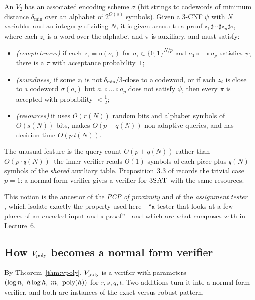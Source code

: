 \begin{definition}\label{def:normal}
An  $V_2$ has an associated encoding scheme $\sigma$ (bit strings to codewords of minimum distance $\delta_{\min}$ over an alphabet of $2^{O(s)}$ symbols).
Given a $3$-CNF $\psi$ with $N$ variables and an integer $p$ dividing $N$, it is given access to a proof $z_1\sharp\cdots\sharp z_p\sharp\pi$, where each $z_i$ is a word over the alphabet and $\pi$ is auxiliary, and must satisfy:
\begin{itemize}
  \item \emph{(completeness)} if each $z_i=\sigma(a_i)$ for $a_i\in\{0,1\}^{N/p}$ and $a_1\circ\dots\circ a_p$ satisfies $\psi$, there is a $\pi$ with acceptance probability~$1$;
  \item \emph{(soundness)} if some $z_i$ is not $\delta_{\min}/3$-close to a codeword, or if each $z_i$ is close to a codeword $\sigma(a_i)$ but $a_1\circ\dots\circ a_p$ does not satisfy $\psi$, then every $\pi$ is accepted with probability $<\tfrac12$;
  \item \emph{(resources)} it uses $O(r(N))$ random bits and alphabet symbols of $O(s(N))$ bits, makes $O(p+q(N))$ non-adaptive queries, and has decision time $O(p\,t(N))$.
\end{itemize}
\end{definition}

\noindent
The unusual feature is the query count $O(p+q(N))$ rather than $O(p\cdot q(N))$: the inner verifier reads $O(1)$ symbols of each piece plus $q(N)$ symbols of the \emph{shared} auxiliary table.
Proposition~3.3 of \citet{AroraSafra98} records the trivial case $p=1$: a normal form verifier gives a verifier for $\textsc{3SAT}$ with the same resources.

This notion is the ancestor of the \emph{PCP of proximity} \citep{BGHSV06} and of the \emph{assignment tester} \citep{DR04}, which isolate exactly the property used here---``a tester that looks at a few places of an encoded input
and a proof''---and which are what \citet{Dinur07} composes with in Lecture~6.

\subsection{How $V_{\rm poly}$ becomes a normal form verifier}

By Theorem~\ref{thm:vpoly}, $V_{\rm poly}$ is a verifier with parameters $(\log n,\ h\log h,\ m,\ \operatorname{poly}(h))$ for $r,s,q,t$.  Two additions turn it into a normal form verifier, and
both are instances of the exact-versus-robust pattern.

